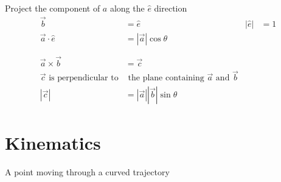 \documentclass[12pt]{article}
\begin{document}
Project the component of $a$ along the $\hat{e}$ direction
\begin{align*}
	\overrightarrow{b}                             & = \hat{e}                                                                        & |\hat{e}| & = 1 \\
	\overrightarrow{a} \cdot \hat{e}               & = |\overrightarrow{a}| \cos{\theta}                                                                \\
	\phantom{=}                                                                                                                                         \\
	\overrightarrow{a} \times \overrightarrow{b}   & = \overrightarrow{c}                                                                               \\
	\overrightarrow{c} \text{ is perpendicular to} & \text{ the plane containing } \overrightarrow{a} \text{ and } \overrightarrow{b}                   \\
	|\overrightarrow{c}|                           & = |\overrightarrow{a}| |\overrightarrow{b}| \sin{\theta}
\end{align*}

\section{Kinematics}
A point moving through a curved trajectory
\end{document}
